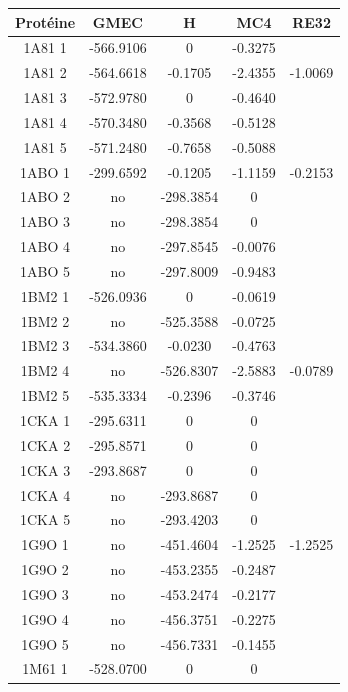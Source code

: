 \documentclass[a4paper,12pt]{article}
\begin{document}
    \begin{table}[h]
      \centering

      \begin{tabular}{|c|c|c|c|c|}


        Protéine & GMEC & H & MC4 & RE32 \\
        \hline
        1A81 1 & -566.9106 & 0 & -0.3275 & \\
        1A81 2 & -564.6618 & -0.1705 & -2.4355 & -1.0069 \\
        1A81 3 & -572.9780 & 0 & -0.4640 & \\
        1A81 4 & -570.3480 & -0.3568 & -0.5128 & \\
        1A81 5 & -571.2480 & -0.7658 & -0.5088 & \\
        1ABO 1 & -299.6592 & -0.1205 & -1.1159 & -0.2153 \\
        1ABO 2 & no & -298.3854 & 0 & \\
        1ABO 3 & no & -298.3854 & 0 & \\
        1ABO 4 & no & -297.8545 & -0.0076 & \\
        1ABO 5 & no & -297.8009 & -0.9483 & \\
        1BM2 1 & -526.0936 & 0 & -0.0619 & \\
        1BM2 2 & no & -525.3588 & -0.0725 & \\
        1BM2 3 & -534.3860 & -0.0230 & -0.4763 & \\
        1BM2 4 & no & -526.8307 & -2.5883 & -0.0789 \\
        1BM2 5 & -535.3334 & -0.2396 & -0.3746 & \\
        1CKA 1 & -295.6311 & 0 & 0 & \\
        1CKA 2 & -295.8571 & 0 & 0 & \\
        1CKA 3 & -293.8687 & 0 & 0 & \\
        1CKA 4 & no & -293.8687 & 0 & \\
        1CKA 5 & no & -293.4203 & 0 & \\
        1G9O 1 & no & -451.4604 & -1.2525 & -1.2525 \\
        1G9O 2 & no & -453.2355 & -0.2487 & \\
        1G9O 3 & no & -453.2474 & -0.2177 & \\
        1G9O 4 & no & -456.3751 & -0.2275 & \\
        1G9O 5 & no & -456.7331 & -0.1455 & \\
        1M61 1 & -528.0700 & 0 & 0 & \\

\end{tabular}
\end{table}
\end{document}
